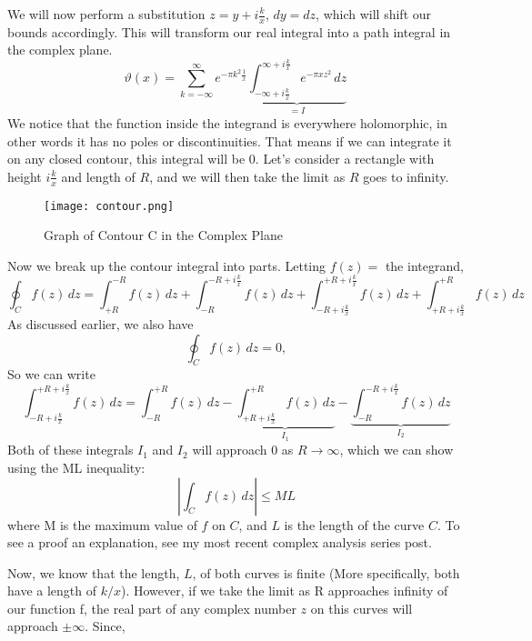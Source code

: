 \documentclass{article}
\begin{document}
We will now perform a substitution $z=y+i\frac{k}{x}$, $dy=dz$, which will shift our bounds accordingly. This will transform our real integral into a path integral in the complex plane. 
\begin{equation*}
    \vartheta(x)=\sum_{k=-\infty}^{\infty} e^{-\pi k^2 \frac{1}{x}}\underbrace{\int_{-\infty+i\frac{k}{x}}^{\infty+i\frac{k}{x}} e^{-\pi xz^2}\,dz}_{=I}  \, 
\end{equation*}
We notice that the function inside the integrand is everywhere holomorphic, in other words it has no poles or discontinuities. That means if we can integrate it on any closed contour, this integral will be 0. Let's consider a rectangle with height $i\frac{k}{x}$ and length of $R$, and we will then take the limit as $R$ goes to infinity.
\begin{figure}[htp]
    \centering
    \texttt{[image: contour.png]}
    \caption{Graph of Contour C in the Complex Plane}
    \label{fig:Desmos}
\end{figure} 
Now we break up the contour integral into parts. Letting $f(z)=$ the integrand,
\begin{equation*}
    \oint_{C} f(z)\,dz=\int_{+R}^{-R} f(z)\,dz+\int_{-R}^{-R+i\frac{k}{x}} f(z)\,dz+\int_{-R+i\frac{k}{x}}^{+R+i\frac{k}{x}} f(z)\,dz+\int_{+R+i\frac{k}{x}}^{+R} f(z)\,dz
\end{equation*}
As discussed earlier, we also have 
\begin{equation*}
     \oint_{C} f(z)\,dz=0,
\end{equation*} 
So we can write 
\begin{equation*}
    \int_{-R+i\frac{k}{x}}^{+R+i\frac{k}{x}} f(z)\,dz=\int_{-R}^{+R} f(z)\,dz-\underbrace{\int_{+R+i\frac{k}{x}}^{+R} f(z)\,dz}_{I_1}-\underbrace{\int_{-R}^{-R+i\frac{k}{x}} f(z)\,dz}_{I_2}
\end{equation*}
Both of these integrals $I_1$ and $I_2$ will approach 0 as $R \rightarrow \infty$, which we can show using the ML inequality:
\begin{equation*}
    \left|\int_{C} f(z)\,dz\right| \leq ML
\end{equation*}
where M is the maximum value of $f$ on $C$, and $L$ is the length of the curve $C$. To see a proof an explanation, see my most recent complex analysis series post. \par Now, we know that the length, $L$, of both curves is finite (More specifically, both have a length of $k/x$). However, if we take the limit as R approaches infinity of our function f, the real part of any complex number $z$ on this curves will approach $\pm \infty$. Since,
\end{document}
